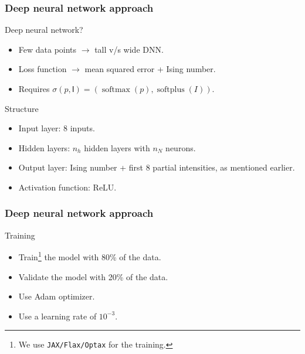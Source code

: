\documentclass{beamer}
\begin{document}
    \begin{frame}
        \frametitle{Deep neural network approach}
        \begin{alertblock}{Deep neural network?}
             \begin{itemize}
                 \item Few data points \(\to\) tall v/s wide DNN.
                 \item Loss function \(\to\) mean squared error + Ising
                     number.
                 \item Requires \(\sigma(p, \mathsf{I}) = (\operatorname{softmax}(p), \operatorname{softplus}(I))\).
             \end{itemize}
        \end{alertblock}
        \begin{block}{Structure}
            \begin{itemize}
                \item Input layer: 8 inputs.
                \item Hidden layers: \(n_h\) hidden layers with \(n_N\) neurons.
                \item Output layer: Ising number + first 8 partial intensities,
                    as mentioned earlier.
                \item Activation function: ReLU.
            \end{itemize}
        \end{block}
    \end{frame}

    \begin{frame}
        \frametitle{Deep neural network approach}
        \begin{block}{Training}
            \begin{itemize}
                \item Train\footnote{
                    We use \texttt{JAX/Flax/Optax} for the training.}
                    the model with 80\% of the data.
                \item Validate the model with 20\% of the data.
                \item Use Adam optimizer.
                \item Use a learning rate of \(10^{-3}\).
            \end{itemize}
        \end{block}

    \end{frame}
\end{document}
